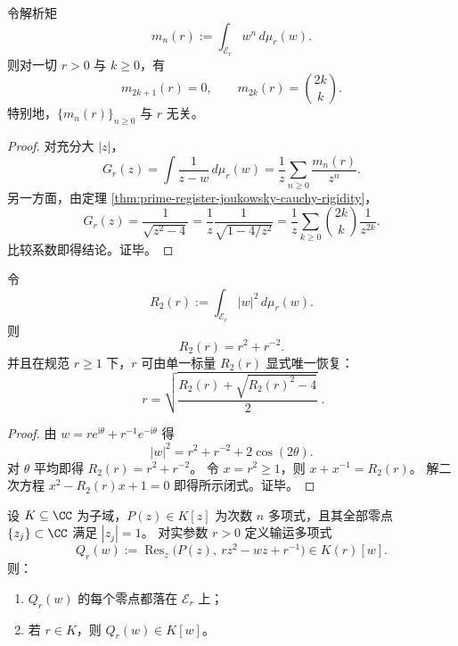 \begin{corollary}\label{cor:prime-register-joukowsky-analytic-moments}
令解析矩
\[
m_n(r):=\int_{\mathcal E_r}w^n\,d\mu_r(w).
\]
则对一切 \(r>0\) 与 \(k\ge0\)，有
\[
m_{2k+1}(r)=0,
\qquad
m_{2k}(r)=\binom{2k}{k}.
\]
特别地，\(\{m_n(r)\}_{n\ge0}\) 与 \(r\) 无关。
\end{corollary}

\begin{proof}
对充分大 \(|z|\)，
\[
G_r(z)=\int\frac{1}{z-w}\,d\mu_r(w)
=\frac{1}{z}\sum_{n\ge0}\frac{m_n(r)}{z^n}.
\]
另一方面，由定理 \ref{thm:prime-register-joukowsky-cauchy-rigidity}，
\[
G_r(z)=\frac{1}{\sqrt{z^2-4}}
=\frac{1}{z}\frac{1}{\sqrt{1-4/z^2}}
=\frac{1}{z}\sum_{k\ge0}\binom{2k}{k}\frac{1}{z^{2k}}.
\]
比较系数即得结论。证毕。
\end{proof}

\begin{proposition}\label{prop:prime-register-joukowsky-radial-moment-invert}
令
\[
R_2(r):=\int_{\mathcal E_r}|w|^2\,d\mu_r(w).
\]
则
\[
R_2(r)=r^2+r^{-2}.
\]
并且在规范 \(r\ge1\) 下，\(r\) 可由单一标量 \(R_2(r)\) 显式唯一恢复：
\[
\boxed{\;
r=\sqrt{\frac{R_2(r)+\sqrt{R_2(r)^2-4}}{2}}\; }.
\]
\end{proposition}

\begin{proof}
由 \(w=r e^{\mathrm{i}\theta}+r^{-1}e^{-\mathrm{i}\theta}\) 得
\[
|w|^2=r^2+r^{-2}+2\cos(2\theta).
\]
对 \(\theta\) 平均即得 \(R_2(r)=r^2+r^{-2}\)。
令 \(x=r^2\ge1\)，则 \(x+x^{-1}=R_2(r)\)。
解二次方程 \(x^2-R_2(r)x+1=0\) 即得所示闭式。证毕。
\end{proof}

\begin{theorem}\label{thm:prime-register-leyang-joukowsky-transport}
设 \(K\subseteq\CC\) 为子域，\(P(z)\in K[z]\) 为次数 \(n\) 多项式，且其全部零点 \(\{z_j\}\subset\CC\) 满足 \(|z_j|=1\)。
对实参数 \(r>0\) 定义输运多项式
\[
Q_r(w):=\operatorname{Res}_{z}\!\bigl(P(z),\ rz^2-wz+r^{-1}\bigr)\in K(r)[w].
\]
则：
\begin{enumerate}
  \item \(Q_r(w)\) 的每个零点都落在 \(\mathcal E_r\) 上；
  \item 若 \(r\in K\)，则 \(Q_r(w)\in K[w]\)。
\end{enumerate}
\end{theorem}


